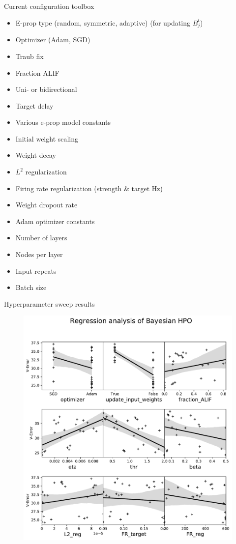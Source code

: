 \documentclass[t]{beamer}
\begin{document}
\begin{frame}{Current configuration toolbox}
	\renewcommand{\baselinestretch}{0.7}
	\footnotesize{
	\begin{itemize}[label=--]

    \item E-prop type (random, symmetric, adaptive) (for updating $B_j^t$)
    \item Optimizer (Adam, SGD)
    \item Traub fix
    \item Fraction ALIF
    \item Uni- or bidirectional
    \item Target delay
    \item Various e-prop model constants
    \item Initial weight scaling
    \item Weight decay
    \item $L^2$ regularization
    \item Firing rate regularization (strength \& target Hz)
    \item Weight dropout rate
    \item Adam optimizer constants
    \item Number of layers
    \item Nodes per layer
    \item Input repeats
    \item Batch size
  \end{itemize}
  }	\renewcommand{\baselinestretch}{1}
\end{frame}


\begin{frame}{Hyperparameter sweep results}

	\begin{figure}[!ht]
		\includegraphics[clip, trim=0cm 0cm 0cm 2.5cm, width=0.64\linewidth]{scatters.pdf}  %
	\end{figure}

\end{frame}
\end{document}
